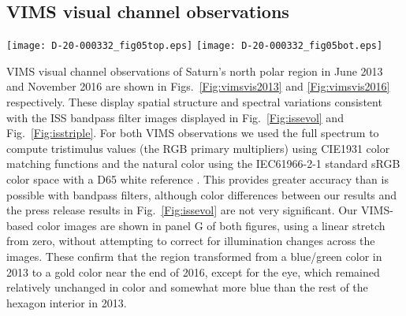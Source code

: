 \documentclass[article,11pt]{emulateapj}
\def\mum{$\mu$m }
\begin{document}
\subsection{VIMS visual channel observations}


\begin{figure*}[!hbt]
\texttt{[image: D-20-000332\_fig05top.eps]}
\texttt{[image: D-20-000332\_fig05bot.eps]}
\caption{VIMS 14 June 2013 visual channel images (A-F), a natural
  color image (G) computed from the spectrum at each pixel, and
  selected visual spectra (H) from locations encircled and numbered in
  images A-F.  The spectral observations were destriped using smoothed
  7-column averages to reduce column-to-column offset changes, as
  described by \cite{Adriani2007}, except for $\lambda < 0.46$ \mum
  for which we used a median instead of an average. The vertical
  dashed lines in H indicate wavelengths of images in panels
  A-F. Numbered circles mark locations from which modeled spectra were
  extracted.}
\label{Fig:vimsvis2013}
\end{figure*}

VIMS visual channel observations of Saturn's north polar region in
June 2013 and November 2016 are shown in Figs.\ \ref{Fig:vimsvis2013}
and \ref{Fig:vimsvis2016} respectively. These display spatial structure
and spectral variations consistent with the
ISS bandpass filter images displayed in Fig.\ \ref{Fig:issevol} and
Fig.\ \ref{Fig:isstriple}. For both VIMS observations we used the full
spectrum to compute tristimulus values (the RGB primary multipliers) using CIE1931 color matching
functions \citep{CIE1932} and the natural color using the IEC61966-2-1 standard sRGB
color space with a D65 white reference \citep{IEC99}. This provides greater
accuracy than is possible with bandpass filters, although color
differences between our results and the press release results in Fig.\ \ref{Fig:issevol} are not
very significant.  Our VIMS-based color images are
shown in panel G of both figures, using a linear stretch from zero,
without attempting to correct for illumination changes across the
images.  These confirm that the region
transformed from a blue/green color in 2013 to a gold color near the
end of 2016, except for the eye, which remained relatively
unchanged in color and somewhat more blue than the rest of the
hexagon interior in 2013.  
\end{document}
